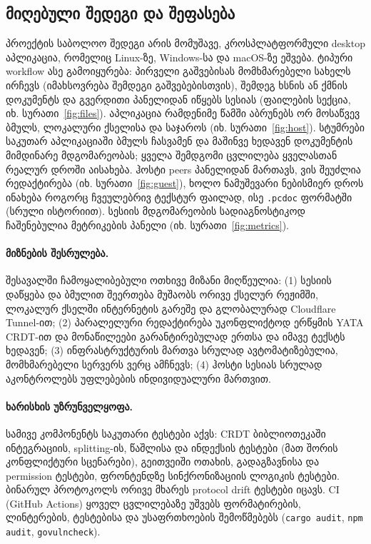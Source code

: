 \subsection{მიღებული შედეგი და შეფასება}

პროექტის საბოლოო შედეგი არის მომუშავე, კროსპლატფორმული desktop
აპლიკაცია, რომელიც Linux-ზე, Windows-სა და macOS-ზე ეშვება. ტიპური
workflow ასე გამოიყურება: პირველი გაშვებისას მომხმარებელი სახელს
ირჩევს (იმახსოვრება შემდეგი გაშვებებისთვის), შემდეგ ხსნის ან ქმნის
დოკუმენტს და გვერდითი პანელიდან იწყებს სესიას (ფაილების სექცია, იხ.
სურათი~\ref{fig:files}). აპლიკაცია რამდენიმე წამში
აბრუნებს ორ მოსაწვევ ბმულს, ლოკალური ქსელისა და საჯაროს (იხ.
სურათი~\ref{fig:host}). სტუმრები საკუთარ აპლიკაციაში ბმულს ჩასვამენ
და მაშინვე ხედავენ დოკუმენტის მიმდინარე მდგომარეობას; ყველა შემდგომი
ცვლილება ყველასთან რეალურ დროში აისახება. ჰოსტი peers პანელიდან
მართავს, ვის შეუძლია რედაქტირება (იხ. სურათი~\ref{fig:guest}), ხოლო
ნამუშევარი ნებისმიერ დროს ინახება როგორც ჩვეულებრივ ტექსტურ ფაილად, ისე
\texttt{.pcdoc} ფორმატში (სრული ისტორიით). სესიის მდგომარეობის
სადიაგნოსტიკოდ ჩაშენებულია მეტრიკების პანელი (იხ.
სურათი~\ref{fig:metrics}).





\paragraph{მიზნების შესრულება.}
შესავალში ჩამოყალიბებული ოთხივე მიზანი მიღწეულია: (1) სესიის დაწყება და
ბმულით შეერთება მუშაობს ორივე ქსელურ რეჟიმში, ლოკალურ ქსელში
ინტერნეტის გარეშე და გლობალურად Cloudflare Tunnel-ით; (2) პარალელური
რედაქტირება უკონფლიქტოდ ერწყმის YATA CRDT-ით და მონაწილეები
გარანტირებულად ერთსა და იმავე ტექსტს ხედავენ; (3) ინფრასტრუქტურის მართვა
სრულად ავტომატიზებულია, მომხმარებელი სერვერს ვერც ამჩნევს; (4) ჰოსტი
სესიას სრულად აკონტროლებს უფლებების ინდივიდუალური მართვით.

\paragraph{ხარისხის უზრუნველყოფა.}
სამივე კომპონენტს საკუთარი ტესტები აქვს: CRDT ბიბლიოთეკაში
ინტეგრაციის, splitting-ის, წაშლისა და ინდექსის ტესტები (მათ შორის
კონფლიქტური სცენარები), გეითვეიში ოთახის, გადაგზავნისა და permission
ტესტები, ფრონტენდზე სინქრონიზაციის ლოგიკის ტესტები. ბინარულ პროტოკოლს
ორივე მხარეს protocol drift ტესტები იცავს. CI (GitHub Actions) ყოველ
ცვლილებაზე უშვებს ფორმატირების, ლინტერების, ტესტებისა და უსაფრთხოების
შემოწმებებს (\texttt{cargo audit}, \texttt{npm audit},
\texttt{govulncheck}).

